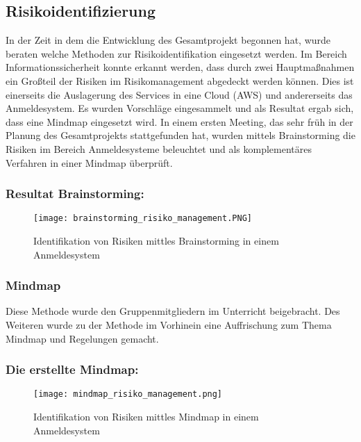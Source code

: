 \subsection{Risikoidentifizierung}
In der Zeit in dem die Entwicklung des Gesamtprojekt begonnen hat, wurde beraten welche Methoden zur Risikoidentifikation eingesetzt werden. Im Bereich Informationssicherheit konnte erkannt werden, dass durch zwei Hauptmaßnahmen ein Großteil der Risiken im Risikomanagement abgedeckt werden können. Dies ist einerseits die Auslagerung des Services in eine Cloud (AWS) und andererseits das Anmeldesystem. Es wurden Vorschläge eingesammelt und als Resultat ergab sich, dass eine Mindmap eingesetzt wird.
In einem ersten Meeting, das sehr früh in der Planung des Gesamtprojekts stattgefunden hat, wurden mittels Brainstorming die Risiken im Bereich Anmeldesysteme beleuchtet und als komplementäres Verfahren in einer Mindmap überprüft.

\subsubsection{Resultat Brainstorming:}
\begin{center}
\begin{figure}[H]
    \centering
    \texttt{[image: brainstorming\_risiko\_management.PNG]}
    \caption{Identifikation von Risiken mittles Brainstorming in einem Anmeldesystem}
\end{figure}
\end{center}

\subsubsection{Mindmap}
Diese Methode wurde den Gruppenmitgliedern im Unterricht beigebracht. Des Weiteren wurde zu der Methode im Vorhinein eine Auffrischung zum Thema Mindmap und Regelungen gemacht.

\subsubsection{Die erstellte Mindmap:}
\begin{center}
\begin{figure}[H]
    \centering
    \texttt{[image: mindmap\_risiko\_management.png]}
    \caption{Identifikation von Risiken mittles Mindmap in einem Anmeldesystem}
\end{figure}
\end{center}

